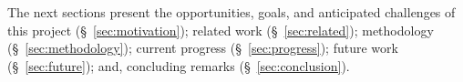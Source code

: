 The next sections present the opportunities, goals, and anticipated challenges of this project (\S~\ref{sec:motivation}); related work (\S~\ref{sec:related}); methodology (\S~\ref{sec:methodology}); current progress (\S~\ref{sec:progress}); future work (\S~\ref{sec:future}); and, concluding remarks (\S ~\ref{sec:conclusion}).
